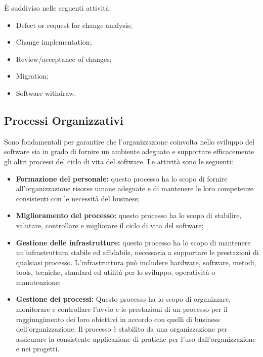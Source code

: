 È suddiviso nelle seguenti attività:

\begin{itemize}

  \item Defect or request for change analysis;

  \item Change implementation;

  \item Review/acceptance of changes;

  \item Migration;

  \item Software withdraw.

\end{itemize}


\subsection{Processi Organizzativi}
Sono fondamentali per garantire che l'organizzazione coinvolta nello sviluppo del software sia in grado di fornire un ambiente adeguato e supportare efficacemente gli altri processi del ciclo di vita del software.
Le attività sono le seguenti:
\begin{itemize}
    \item \textbf{Formazione del personale:} questo processo ha lo scopo di fornire all'organizzazione risorse umane adeguate e di mantenere le loro competenze consistenti con le necessità del business;
    \item \textbf{Miglioramento del processo:} questo processo ha lo scopo di stabilire, valutare, controllare e migliorare il ciclo di vita del software;
    \item \textbf{Gestione delle infrastrutture:} questo processo ha lo scopo di mantenere un'infrastruttura stabile ed affidabile, necessaria a supportare le prestazioni di qualsiasi processo.
    L'infrastruttura può includere hardware, software, metodi, tools, tecniche, standard ed utilità per lo sviluppo, operatività o manutenzione;
    
    \item \textbf{Gestione dei processi:} Questo processo ha lo scopo di organizzare, monitorare e controllare l'avvio e le prestazioni di un processo per il raggiungimento dei loro obiettivi in accordo con quelli di business dell'organizzazione.
    Il processo è stabilito da una organizzazione per assicurare la consistente applicazione di pratiche per l'uso dall'organizzazione e nei progetti.
    

    
\end{itemize}

